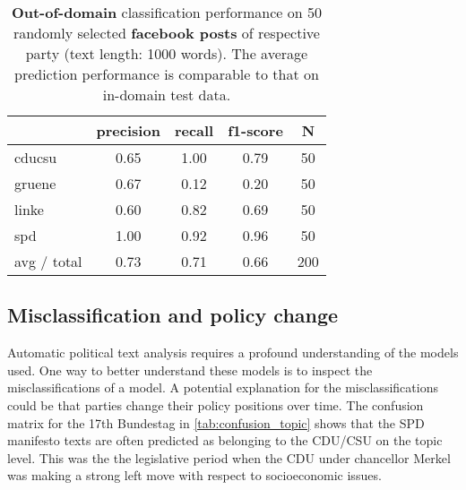 \documentclass[11pt]{article}
\begin{document}
\begin{table}[t]
\caption{
\label{tab:results_fb}
{\bf  Out-of-domain} classification performance on 50 randomly selected {\bf facebook posts} of respective party (text length: 1000 words). The average prediction performance is comparable to that on in-domain test data.}
\begin{center}
\begin{tabular}{lcccc}
    &         precision    &recall &  f1-score  & N  \\
    \hline
        \hline
 cducsu     &  0.65     & 1.00  &    0.79     &   50\\
     gruene   &    0.67   &   0.12  &    0.20   &     50\\
      linke       &0.60    &  0.82    &  0.69    &    50\\
        spd       &1.00 &     0.92   &   0.96    &    50\\
\hline
avg / total    &   0.73   &   0.71  &    0.66   &    200\\
\end{tabular}
\end{center}

\end{table}

\subsection{Misclassification and policy change}
Automatic political text analysis requires a profound understanding of the models used. One way to better understand these models is to inspect the misclassifications of a model. A potential explanation for the misclassifications could be that parties change their policy positions over time. 
The confusion matrix for the 17th Bundestag in \autoref{tab:confusion_topic} shows that the SPD manifesto texts are often predicted as belonging to the CDU/CSU on the topic level. This was the the legislative period when the CDU under chancellor Merkel was making a strong left move with respect to socioeconomic issues. \\
\end{document}
